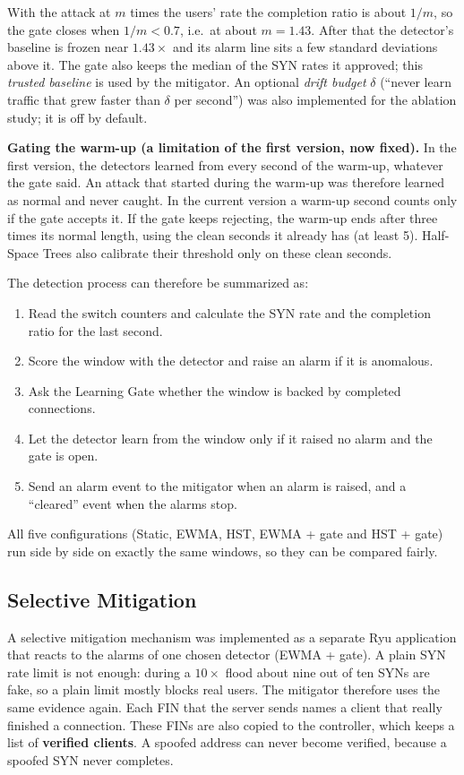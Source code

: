 \documentclass[12pt,a4paper]{article}
\begin{document}
With the attack at $m$ times the users' rate the completion ratio is about
$1/m$, so the gate closes when $1/m < 0.7$, i.e.\ at about $m = 1.43$. After that
the detector's baseline is frozen near $1.43\times$ and its alarm line sits a few
standard deviations above it. The gate also keeps the median of the SYN rates it
approved; this \emph{trusted baseline} is used by the mitigator. An optional
\emph{drift budget} $\delta$ (``never learn traffic that grew faster than
$\delta$ per second'') was also implemented for the ablation study; it is off
by default.

\textbf{Gating the warm-up (a limitation of the first version, now fixed).}
In the first version, the detectors learned from every second of the warm-up,
whatever the gate said. An attack that started during the warm-up was therefore
learned as normal and never caught. In the current version a warm-up second
counts only if the gate accepts it. If the gate keeps rejecting, the warm-up
ends after three times its normal length, using the clean seconds it already
has (at least 5). Half-Space Trees also calibrate their threshold only on these
clean seconds.

The detection process can therefore be summarized as:
\begin{enumerate}
  \item Read the switch counters and calculate the SYN rate and the completion
  ratio for the last second.
  \item Score the window with the detector and raise an alarm if it is
  anomalous.
  \item Ask the Learning Gate whether the window is backed by completed
  connections.
  \item Let the detector learn from the window only if it raised no alarm and the
  gate is open.
  \item Send an alarm event to the mitigator when an alarm is raised, and a
  ``cleared'' event when the alarms stop.
\end{enumerate}

All five configurations (Static, EWMA, HST, EWMA + gate and HST + gate) run side
by side on exactly the same windows, so they can be compared fairly.

\subsection{Selective Mitigation}
A selective mitigation mechanism was implemented as a separate Ryu application
that reacts to the alarms of one chosen detector (EWMA + gate). A plain SYN
rate limit is not enough: during a $10\times$ flood about nine out of ten SYNs
are fake, so a plain limit mostly blocks real users. The mitigator therefore
uses the same evidence again. Each FIN that the server sends names a client
that really finished a connection. These FINs are also copied to the
controller, which keeps a list of \textbf{verified clients}. A spoofed address
can never become verified, because a spoofed SYN never completes.
\end{document}
